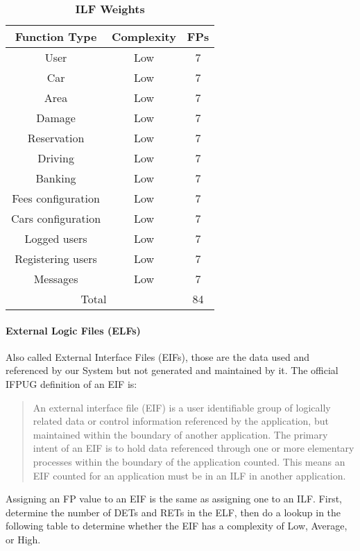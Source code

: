 \begin{longtable}{| c | c | c |}
	\caption{\textbf{ILF Weights}} %
	\label{tab:ilf_weights}%
	\\ \hline %
	
	\textbf{Function Type} & \textbf{Complexity} & \textbf{FPs}\\ \hline
	User & Low & 7\\ \hline
	Car & Low & 7\\ \hline
	Area & Low & 7\\ \hline
	Damage & Low & 7\\ \hline
	Reservation & Low & 7\\ \hline
	Driving & Low & 7\\ \hline
	Banking & Low & 7\\ \hline
	Fees configuration & Low & 7\\ \hline
	Cars configuration & Low & 7\\ \hline
	Logged users & Low & 7\\ \hline
	Registering users & Low & 7 \\ \hline
	Messages & Low & 7 \\ \hline
	\multicolumn{2}{|c|}{Total} & 84 \\ \hline
	
\end{longtable}

\paragraph{External Logic Files (ELFs)}
Also called External Interface Files (EIFs), those are the data used and referenced by our System but not generated and maintained by it.
The official IFPUG definition of an EIF is:

\begin{quote}
An external interface file (EIF) is a user identifiable group of logically related data or control information referenced by the application, but maintained within the boundary of another application. The primary intent of an EIF is to hold data referenced through one or more elementary processes within the boundary of the application counted. This means an EIF counted for an application must be in an ILF in another application.
\end{quote}

Assigning an FP value to an EIF is the same as assigning one to an ILF. First, determine the number of DETs and RETs in the ELF, then do a lookup in the following table to determine whether the EIF has a complexity of Low, Average, or High.  

